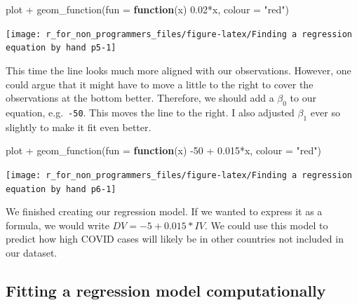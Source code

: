 \documentclass[
]{book}
\newenvironment{Shaded}{\begin{snugshade}}{\end{snugshade}}
\newcommand{\AttributeTok}[1]{\textcolor[rgb]{0.77,0.63,0.00}{#1}}
\newcommand{\ControlFlowTok}[1]{\textcolor[rgb]{0.13,0.29,0.53}{\textbf{#1}}}
\newcommand{\DecValTok}[1]{\textcolor[rgb]{0.00,0.00,0.81}{#1}}
\newcommand{\FloatTok}[1]{\textcolor[rgb]{0.00,0.00,0.81}{#1}}
\newcommand{\FunctionTok}[1]{\textcolor[rgb]{0.00,0.00,0.00}{#1}}
\newcommand{\NormalTok}[1]{#1}
\newcommand{\SpecialCharTok}[1]{\textcolor[rgb]{0.00,0.00,0.00}{#1}}
\newcommand{\StringTok}[1]{\textcolor[rgb]{0.31,0.60,0.02}{#1}}
\begin{document}
\begin{Shaded}
\begin{Highlighting}[]
\NormalTok{plot }\SpecialCharTok{+}
  \FunctionTok{geom\_function}\NormalTok{(}\AttributeTok{fun =} \ControlFlowTok{function}\NormalTok{(x) }\FloatTok{0.02}\SpecialCharTok{*}\NormalTok{x, }\AttributeTok{colour =} \StringTok{"red"}\NormalTok{)}
\end{Highlighting}
\end{Shaded}

\begin{center}\texttt{[image: r\_for\_non\_programmers\_files/figure-latex/Finding a regression equation by hand p5-1]} \end{center}

This time the line looks much more aligned with our observations. However, one could argue that it might have to move a little to the right to cover the observations at the bottom better. Therefore, we should add a \(\beta_0\) to our equation, e.g.~\texttt{-50}. This moves the line to the right. I also adjusted \(\beta_1\) ever so slightly to make it fit even better.

\begin{Shaded}
\begin{Highlighting}[]
\NormalTok{plot }\SpecialCharTok{+}
  \FunctionTok{geom\_function}\NormalTok{(}\AttributeTok{fun =} \ControlFlowTok{function}\NormalTok{(x) }\SpecialCharTok{{-}}\DecValTok{50} \SpecialCharTok{+} \FloatTok{0.015}\SpecialCharTok{*}\NormalTok{x, }\AttributeTok{colour =} \StringTok{"red"}\NormalTok{)}
\end{Highlighting}
\end{Shaded}

\begin{center}\texttt{[image: r\_for\_non\_programmers\_files/figure-latex/Finding a regression equation by hand p6-1]} \end{center}

We finished creating our regression model. If we wanted to express it as a formula, we would write \(DV = -5 + 0.015 * IV\). We could use this model to predict how high COVID cases will likely be in other countries not included in our dataset.

\hypertarget{fitting-a-regression-model-computationally}{%
\subsection{Fitting a regression model computationally}\label{fitting-a-regression-model-computationally}}
\end{document}
